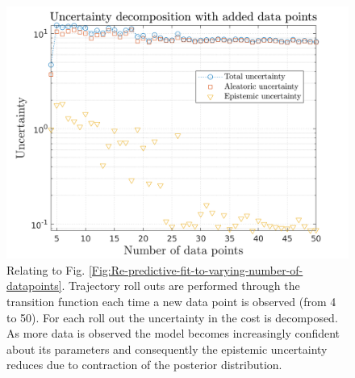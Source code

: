 \begin{figure}[htp!]
\centering    
\includegraphics[width=1\textwidth]{Chapter3/Figures/func_uncertainty_4.png}
\caption[Uncertainty decomposition showing reduction in epistemic uncertainty with increasing number of data points]{Relating to Fig. \ref{Fig:Re-predictive-fit-to-varying-number-of-datapoints}. Trajectory roll outs are performed through the transition function each time a new data point is observed (from 4 to 50). For each roll out the uncertainty in the cost is decomposed. As more data is observed the model becomes increasingly confident about its parameters and consequently the epistemic uncertainty reduces due to contraction of the posterior distribution.}
\label{Fig:Re-reduction-in-epsitemic-with-more-data}
\end{figure}



